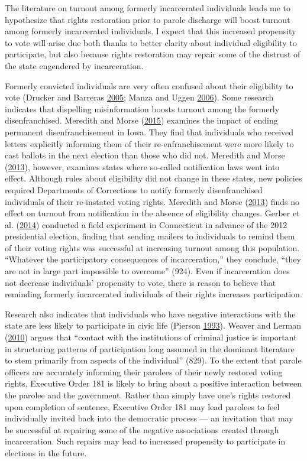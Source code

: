 \documentclass[12pt,]{article}
\begin{document}
The literature on turnout among formerly incarcerated individuals leads me to hypothesize that rights restoration prior to parole discharge will boost turnout among formerly incarcerated individuals. I expect that this increased propensity to vote will arise due both thanks to better clarity about individual eligibility to participate, but also because rights restoration may repair some of the distrust of the state engendered by incarceration.

Formerly convicted individuals are very often confused about their eligibility to vote (Drucker and Barreras \protect\hyperlink{ref-Drucker2005}{2005}; Manza and Uggen \protect\hyperlink{ref-locked_out}{2006}). Some research indicates that dispelling misinformation boosts turnout among the formerly disenfranchised. Meredith and Morse (\protect\hyperlink{ref-Meredith2015}{2015}) examines the impact of ending permanent disenfranchisement in Iowa. They find that individuals who received letters explicitly informing them of their re-enfranchisement were more likely to cast ballots in the next election than those who did not. Meredith and Morse (\protect\hyperlink{ref-Meredith2013}{2013}), however, examines states where so-called notification laws went into effect. Although rules about eligibility did not change in these states, new policies required Departments of Corrections to notify formerly disenfranchised individuals of their re-instated voting rights. Meredith and Morse (\protect\hyperlink{ref-Meredith2013}{2013}) finds no effect on turnout from notification in the absence of eligibility changes. Gerber et al. (\protect\hyperlink{ref-Gerber2014}{2014}) conducted a field experiment in Connecticut in advance of the 2012 presidential election, finding that sending mailers to individuals to remind them of their voting rights was successful at increasing turnout among this population. ``Whatever the participatory consequences of incarceration,'' they conclude, ``they are not in large part impossible to overcome'' (924). Even if incarceration does not decrease individuals' propensity to vote, there is reason to believe that reminding formerly incarcerated individuals of their rights increases participation.

Research also indicates that individuals who have negative interactions with the state are less likely to participate in civic life (Pierson \protect\hyperlink{ref-Pierson1993}{1993}). Weaver and Lerman (\protect\hyperlink{ref-Weaver2010}{2010}) argues that ``contact with the institutions of criminal justice is important in structuring patterns of participation long assumed in the dominant literature to stem primarily from aspects of the individual'' (829). To the extent that parole officers are accurately informing their parolees of their newly restored voting rights, Executive Order 181 is likely to bring about a positive interaction between the parolee and the government. Rather than simply have one's rights restored upon completion of sentence, Executive Order 181 may lead parolees to feel individually invited back into the democratic process --- an invitation that may be successful at repairing some of the negative associations created through incarceration. Such repairs may lead to increased propensity to participate in elections in the future.
\end{document}
